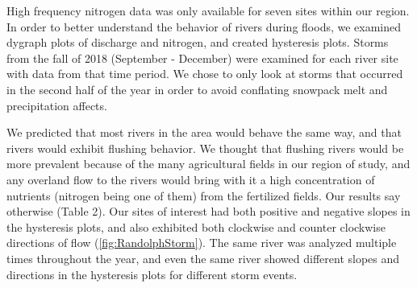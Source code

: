 \documentclass[12pt,]{article}
\begin{document}
High frequency nitrogen data was only available for seven sites within
our region. In order to better understand the behavior of rivers during
floods, we examined dygraph plots of discharge and nitrogen, and created
hysteresis plots. Storms from the fall of 2018 (September - December)
were examined for each river site with data from that time period. We
chose to only look at storms that occurred in the second half of the
year in order to avoid conflating snowpack melt and precipitation
affects.

We predicted that most rivers in the area would behave the same way, and
that rivers would exhibit flushing behavior. We thought that flushing
rivers would be more prevalent because of the many agricultural fields
in our region of study, and any overland flow to the rivers would bring
with it a high concentration of nutrients (nitrogen being one of them)
from the fertilized fields. Our results say otherwise (Table 2). Our
sites of interest had both positive and negative slopes in the
hysteresis plots, and also exhibited both clockwise and counter
clockwise directions of flow (\autoref{fig:RandolphStorm}). The same
river was analyzed multiple times throughout the year, and even the same
river showed different slopes and directions in the hysteresis plots for
different storm events.
\end{document}
